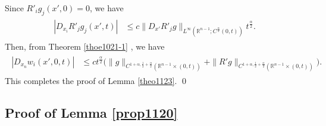 \documentclass{amsart}
\numberwithin{equation}{section}
\newcommand {\al}{\alpha}
\newcommand{\Rn}{{\mathbb R}^{n-1}}
\begin{document}
Since  $  R'_i g_j (x',0)     =0$, we have 
\begin{align*}
\begin{split}
 | D_{x_i}R'_j  g_j (x',t) | & \leq   c \| D_{x'} R'_j g\|_{L^\infty (\Rn ; C^{\frac{\al}2}(0, t)) }  t^{\frac{\al}2}.
    \end{split}
\end{align*}
Then, from Theorem \ref{thoe1021-1} , we have
\begin{align*}  
\begin{split}
| D_{x_n} w_i   (x',0,t)|  & \leq c  t^{\frac{\al}2} \Big(  \|  g\|_{ C^{1 +\al,\frac12 +\frac{\al}2}(\Rn \times (0, t))}    +  \| R' g\|_{ C^{1 +\al,\frac12 +\frac{\al}2}(\Rn \times (0, t))} \Big).
\end{split}
\end{align*}
This completes the proof of  Lemma \ref{theo1123}. 
\qed
 


\subsection{Proof of Lemma \ref{prop1120} }
\label{proofprop1120}
\end{document}
